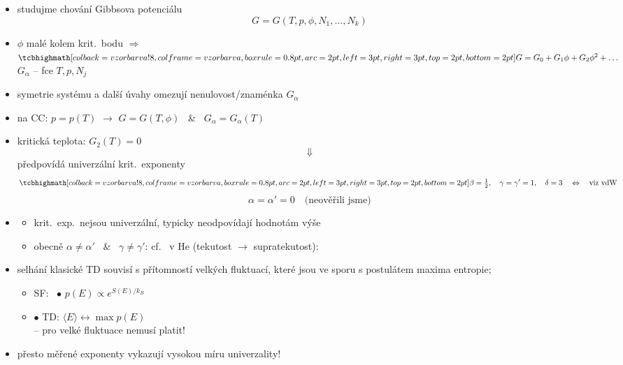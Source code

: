 \begin{itemize}
  \item studujme chování Gibbsova potenciálu
  \[ G = G(T,p,\phi,N_1,\dots,N_k) \]
  \item $\phi$ malé kolem krit.\ bodu $\Rightarrow$ \quad $\vzorec{G = G_0 + G_1\phi + G_2\phi^2 + \dots}$ \\
        \hspace*{2em} $G_\alpha$ -- fce $T,p,N_j$
  \item symetrie systému a další úvahy omezují nenulovost/znaménka $G_\alpha$
  \item na CC: $p = p(T)$ $\to$ $G = G(T,\phi)$ \ \& \ $G_\alpha = G_\alpha(T)$
  \item kritická teplota: $G_2(T) = 0$
  \[ \Downarrow \]
  předpovídá univerzální krit.\ exponenty
  \[ \vzorec{\beta = \tfrac12,\quad \gamma = \gamma' = 1,\quad \delta = 3} \quad\Leftrightarrow\quad \text{viz vdW} \]
  \[ \alpha = \alpha' = 0 \quad \text{(neověřili jsme)} \]
  \item {}
  \begin{itemize}[nosep]
    \item[--] krit.\ exp.\ nejsou univerzální, typicky neodpovídají hodnotám výše
    \item[--] obecně $\alpha\neq\alpha'$ \ \& \ $\gamma\neq\gamma'$: cf.\  v He (tekutost $\to$ supratekutost):
  \end{itemize}
\end{itemize}
\begin{center}
\end{center}
\begin{itemize}
  \item selhání klasické TD souvisí s přítomností velkých fluktuací, které jsou ve sporu s postulátem maxima entropie;
  \begin{itemize}[nosep]
    \item[] SF: \ $\bullet$ $p(E)\propto e^{S(E)/k_B}$
    \item[] \hspace*{2.3em}$\bullet$ TD: $\langle E\rangle \leftrightarrow \max p(E)$ \\
            \hspace*{3.5em} -- pro velké fluktuace nemusí platit!
  \end{itemize}
  \item přesto měřené exponenty vykazují vysokou míru univerzality!
\end{itemize}

